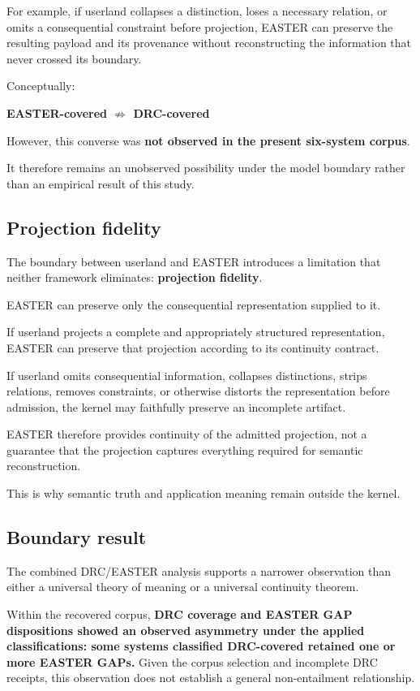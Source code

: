 \documentclass[11pt]{article}
\begin{document}
For example, if userland collapses a distinction, loses a necessary relation, or omits a consequential constraint before projection, EASTER can preserve the resulting payload and its provenance without reconstructing the information that never crossed its boundary.

Conceptually:

\textbf{EASTER-covered $\not\Rightarrow$ DRC-covered}

However, this converse was \textbf{not observed in the present six-system corpus}.

It therefore remains an unobserved possibility under the model boundary rather than an empirical result of this study.

\subsection{Projection fidelity}

The boundary between userland and EASTER introduces a limitation that neither framework eliminates: \textbf{projection fidelity}.

EASTER can preserve only the consequential representation supplied to it.

If userland projects a complete and appropriately structured representation, EASTER can preserve that projection according to its continuity contract.

If userland omits consequential information, collapses distinctions, strips relations, removes constraints, or otherwise distorts the representation before admission, the kernel may faithfully preserve an incomplete artifact.

EASTER therefore provides continuity of the admitted projection, not a guarantee that the projection captures everything required for semantic reconstruction.

This is why semantic truth and application meaning remain outside the kernel.

\subsection{Boundary result}

The combined DRC/EASTER analysis supports a narrower observation than either a universal theory of meaning or a universal continuity theorem.

Within the recovered corpus, \textbf{DRC coverage and EASTER GAP dispositions showed an observed asymmetry under the applied classifications: some systems classified DRC-covered retained one or more EASTER GAPs.} Given the corpus selection and incomplete DRC receipts, this observation does not establish a general non-entailment relationship.
\end{document}
